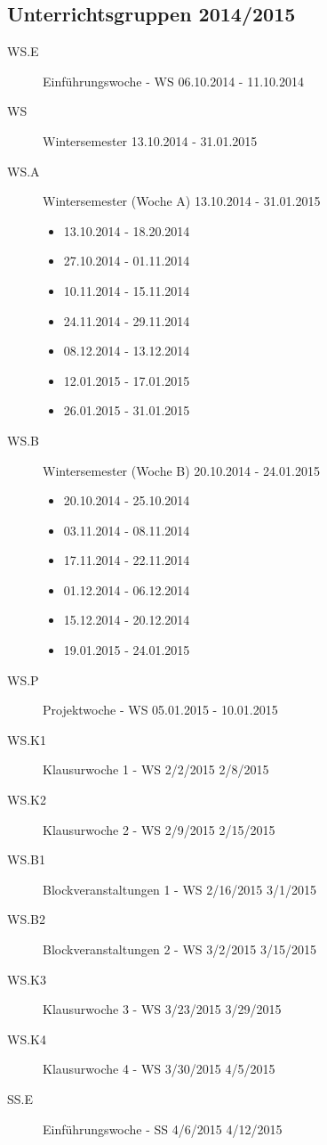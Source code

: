 \documentclass[]{report}
\begin{document}
\begin{appendices}
\section{Unterrichtsgruppen 2014/2015}
\label{sec:unterrichtsgruppen-values}
\begin{description}
	\item[WS.E]	Einführungswoche - WS 06.10.2014 - 11.10.2014	 	 	 	
	\item[WS]	Wintersemester	13.10.2014 - 31.01.2015	
	\item[WS.A]	Wintersemester (Woche A) 13.10.2014 - 31.01.2015
		\begin{itemize}
			\item 13.10.2014 - 18.20.2014
			\item 27.10.2014 - 01.11.2014
			\item 10.11.2014 - 15.11.2014
			\item 24.11.2014 - 29.11.2014
			\item 08.12.2014 - 13.12.2014
			\item 12.01.2015 - 17.01.2015
			\item 26.01.2015 - 31.01.2015
		\end{itemize}
	\item[WS.B]	Wintersemester (Woche B) 20.10.2014 - 24.01.2015
		\begin{itemize}
			\item 20.10.2014 - 25.10.2014
			\item 03.11.2014 - 08.11.2014
			\item 17.11.2014 - 22.11.2014
			\item 01.12.2014 - 06.12.2014
			\item 15.12.2014 - 20.12.2014
			\item 19.01.2015 - 24.01.2015
		\end{itemize}
	\item[WS.P]	Projektwoche - WS 05.01.2015 - 10.01.2015	 	 	 	
	\item[WS.K1] Klausurwoche 1 - WS	2/2/2015	2/8/2015	 	 	 	
	\item[WS.K2] Klausurwoche 2 - WS	2/9/2015	2/15/2015	 	 	 	
	\item[WS.B1] Blockveranstaltungen 1 - WS	2/16/2015	3/1/2015	 	 	 	
	\item[WS.B2] Blockveranstaltungen 2 - WS	3/2/2015	3/15/2015	 	 	 	
	\item[WS.K3] Klausurwoche 3 - WS	3/23/2015	3/29/2015	 	 	 	
	\item[WS.K4] Klausurwoche 4 - WS	3/30/2015	4/5/2015	 	 	 	
	\item[SS.E]	Einführungswoche - SS	4/6/2015	4/12/2015	 	 	 	

\end{description}
\end{appendices}
\end{document}

